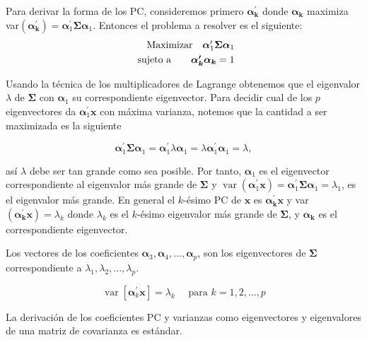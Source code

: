 Para derivar la forma de los PC, consideremos primero $\boldsymbol{\alpha_k^\prime}$ donde $\boldsymbol{\alpha_k}$ maximiza var$(\boldsymbol{\alpha_k^\prime})= \boldsymbol{\alpha}_{1}^{\prime} \boldsymbol{\Sigma} \boldsymbol{\alpha}_{1}$. Entonces el problema a resolver es el siguiente:
\[
\begin{array}{r@{}r@{}r@{}l}
	\text{Maximizar} \quad \boldsymbol{\alpha}_{1}^{\prime} \boldsymbol{\Sigma} \boldsymbol{\alpha}_{1} \\[\jot]
	\text{sujeto a}\qquad \boldsymbol{\alpha_k^\prime}\boldsymbol{\alpha_k}=1 \\
	
\end{array}
\]

Usando la técnica de los multiplicadores de Lagrange obtenemos que el eigenvalor $\lambda$ de $\boldsymbol{\Sigma}$ con $\boldsymbol{\alpha}_{1}$ su correspondiente eigenvector. Para decidir cual de los $p$ eigenvectores da $\boldsymbol{\alpha}_{1}^{\prime}\boldsymbol{x}$ con máxima varianza, notemos que la cantidad a ser maximizada es la siguiente

\[
\boldsymbol{\alpha}_{1}^{\prime} \boldsymbol{\Sigma} \boldsymbol{\alpha}_{1}=\boldsymbol{\alpha}_{1}^{\prime} \lambda \boldsymbol{\alpha}_{1}=\lambda \boldsymbol{\alpha}_{1}^{\prime} \boldsymbol{\alpha}_{1}=\lambda,
\]

así $\lambda$ debe ser tan grande como sea posible. Por tanto, $\boldsymbol{\alpha}_{1}$ es el eigenvector correspondiente al eigenvalor más grande de $\boldsymbol{\Sigma}$ y $\operatorname{var}\left(\boldsymbol{\alpha}_{1}^{\prime} \mathbf{x}\right)=\boldsymbol{\alpha}_{1}^{\prime} \boldsymbol{\Sigma} \boldsymbol{\alpha}_{1}=\lambda_{1}$, es el eigenvalor más grande.
En general el $k$-ésimo PC de $\boldsymbol{x}$ es $ \boldsymbol{\alpha_k^\prime} \boldsymbol{x}$ y var$(\boldsymbol{\alpha_k^\prime}\boldsymbol{x})=\lambda_k$ donde $\lambda_k$ es el $k$-ésimo eigenvalor más grande de $\boldsymbol{\Sigma}$, y $\boldsymbol{\alpha_k}$ es el correspondiente eigenvector.

Los vectores de los coeficientes $\boldsymbol{\alpha}_{3}, \boldsymbol{\alpha}_{4}, \ldots, \boldsymbol{\alpha}_{p}$, son los eigenvectores de $\boldsymbol{\Sigma}$ correspondiente a $\lambda_{1},\lambda_{2},...,\lambda_{p}$.

\[
\operatorname{var}\left[\boldsymbol{\alpha}_{k}^{\prime} \mathbf{x}\right]=\lambda_{k} \quad \text { para } k=1,2, \ldots, p
\]

La derivación de los coeficientes PC y varianzas como eigenvectores y eigenvalores de una matriz de covarianza es estándar. 

